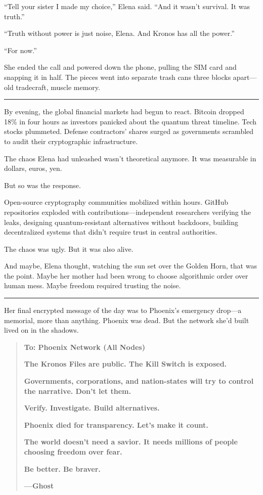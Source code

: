 ``Tell your sister I made my choice,'' Elena said. ``And it wasn't survival. It was truth.''

``Truth without power is just noise, Elena. And Kronos has all the power.''

``For now.''

She ended the call and powered down the phone, pulling the SIM card and snapping it in half. The pieces went into separate trash cans three blocks apart---old tradecraft, muscle memory.

\begin{center}\rule{0.5\linewidth}{0.5pt}\end{center}

By evening, the global financial markets had begun to react. Bitcoin dropped 18\% in four hours as investors panicked about the quantum threat timeline. Tech stocks plummeted. Defense contractors' shares surged as governments scrambled to audit their cryptographic infrastructure.

The chaos Elena had unleashed wasn't theoretical anymore. It was measurable in dollars, euros, yen.

But so was the response.

Open-source cryptography communities mobilized within hours. GitHub repositories exploded with contributions---independent researchers verifying the leaks, designing quantum-resistant alternatives without backdoors, building decentralized systems that didn't require trust in central authorities.

The chaos was ugly. But it was also alive.

And maybe, Elena thought, watching the sun set over the Golden Horn, that was the point. Maybe her mother had been wrong to choose algorithmic order over human mess. Maybe freedom required trusting the noise.

\begin{center}\rule{0.5\linewidth}{0.5pt}\end{center}

Her final encrypted message of the day was to Phoenix's emergency drop---a memorial, more than anything. Phoenix was dead. But the network she'd built lived on in the shadows.

\begin{quote}
\textbf{To: Phoenix Network (All Nodes)}

\textbf{The Kronos Files are public. The Kill Switch is exposed.}

\textbf{Governments, corporations, and nation-states will try to control the narrative. Don't let them.}

\textbf{Verify. Investigate. Build alternatives.}

\textbf{Phoenix died for transparency. Let's make it count.}

\textbf{The world doesn't need a savior. It needs millions of people choosing freedom over fear.}

\textbf{Be better. Be braver.}

\textbf{---Ghost}
\end{quote}


